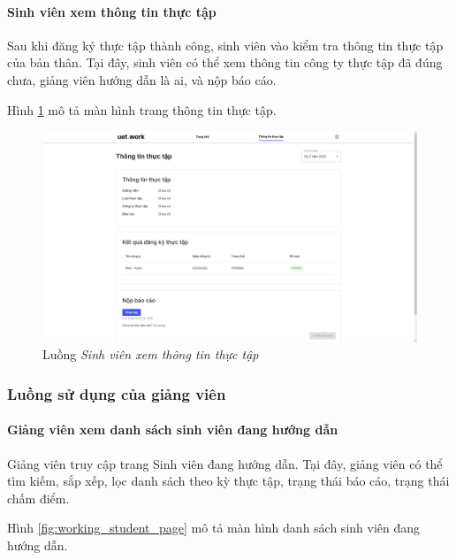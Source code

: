 \documentclass[./../main.tex]{subfiles}
\begin{document}
\paragraph*{Sinh viên xem thông tin thực tập}
Sau khi đăng ký thực tập thành công, sinh viên vào kiểm tra thông tin thực tập của bản thân. Tại đây, sinh viên có thể xem thông tin công ty thực tập đã đúng chưa, giảng viên hướng dẫn là ai, và nộp báo cáo.

Hình \ref{fig:view_internship_page} mô tả màn hình trang thông tin thực tập.

\begin{figure}[]
	\includegraphics[width=\linewidth]{./images/image17.png}
	\caption{Luồng \emph{Sinh viên xem thông tin thực tập}}
	\label{fig:view_internship_page}
\end{figure}

\subsubsection{Luồng sử dụng của giảng viên}

\paragraph*{Giảng viên xem danh sách sinh viên đang hướng dẫn}

Giảng viên truy cập trang Sinh viên đang hướng dẫn. Tại đây, giảng viên có thể tìm kiếm, sắp xếp, lọc danh sách theo kỳ thực tập, trạng thái báo cáo, trạng thái chấm điểm.

Hình \ref{fig:working_student_page} mô tả màn hình danh sách sinh viên đang hướng dẫn.
\end{document}
